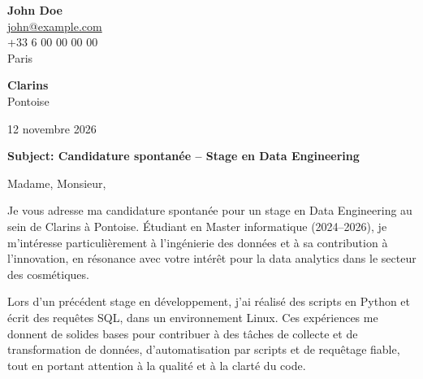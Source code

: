 \documentclass[11pt,a4paper]{article}
\begin{document}
{\Large\bfseries John Doe}\\[0.3cm]


\href{mailto:john@example.com}{john@example.com}\\



+33 6 00 00 00 00\\



Paris\\


\vspace{1cm}

\begin{flushright}

\textbf{Clarins}\\



Pontoise\\


\vspace{0.5cm}

12 novembre 2026

\end{flushright}

\vspace{0.8cm}

\textbf{Subject: Candidature spontanée – Stage en Data Engineering}

\vspace{0.6cm}


Madame, Monsieur,


\vspace{0.5cm}

\justifying


Je vous adresse ma candidature spontanée pour un stage en Data Engineering au sein de Clarins à Pontoise. Étudiant en Master informatique (2024–2026), je m’intéresse particulièrement à l’ingénierie des données et à sa contribution à l’innovation, en résonance avec votre intérêt pour la data analytics dans le secteur des cosmétiques.

\par

Lors d’un précédent stage en développement, j’ai réalisé des scripts en Python et écrit des requêtes SQL, dans un environnement Linux. Ces expériences me donnent de solides bases pour contribuer à des tâches de collecte et de transformation de données, d’automatisation par scripts et de requêtage fiable, tout en portant attention à la qualité et à la clarté du code.
\end{document}
